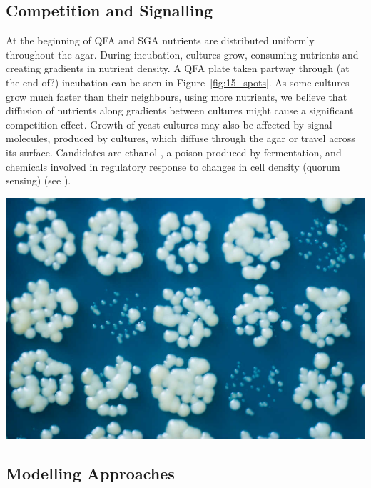 \begin{multicols}{2}


\subsection{Competition and Signalling}

At the beginning of QFA and SGA nutrients are distributed uniformly throughout the
agar. During incubation, cultures grow, consuming nutrients and creating gradients in
nutrient density. A QFA plate taken partway through (at the end of?) incubation can be
seen in Figure~\ref{fig:15_spots}. As some cultures grow much faster than their
neighbours, using more nutrients, we believe that diffusion of nutrients along gradients
between cultures might cause a significant competition effect. Growth of yeast cultures
may also be affected by signal molecules, produced by cultures, which diffuse through the
agar or travel across its surface. Candidates are ethanol \citep{fujita2006}, a poison
produced by fermentation, and chemicals involved in regulatory response
to changes in cell density (quorum sensing) (see \citet{sprague2006,honigberg2011}).

\begin{Figure}
  \centering
  \includegraphics[width=\linewidth]{5658435523_c2e43729f1_b}
  \label{fig:15_spots}
\end{Figure}

\subsection{Modelling Approaches}


\end{multicols}
